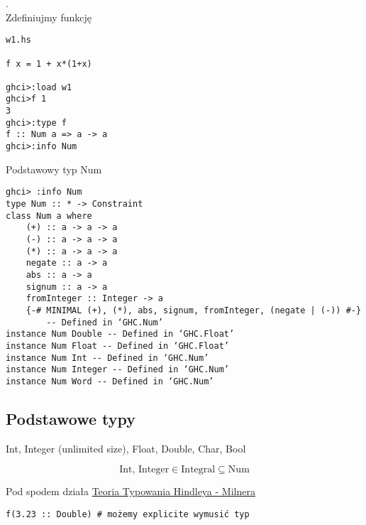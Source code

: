 \documentclass{article}
\newenvironment{definition}[1]{%
    \trivlist
    \item[\hskip\labelsep\textbf{Definition. #1.}]
    \ignorespaces
}{%
    \endtrivlist
}
\begin{document}
\begin{definition}{Funkcja jednej zmiennej}.\\

\noindent
Zdefiniujmy funkcję

\begin{verbatim}
w1.hs

f x = 1 + x*(1+x)

ghci>:load w1
ghci>f 1
3
ghci>:type f
f :: Num a => a -> a
ghci>:info Num 
\end{verbatim}
Podstawowy typ Num
\begin{verbatim}
ghci> :info Num
type Num :: * -> Constraint
class Num a where
    (+) :: a -> a -> a
    (-) :: a -> a -> a
    (*) :: a -> a -> a
    negate :: a -> a
    abs :: a -> a
    signum :: a -> a
    fromInteger :: Integer -> a
    {-# MINIMAL (+), (*), abs, signum, fromInteger, (negate | (-)) #-}
        -- Defined in ‘GHC.Num’
instance Num Double -- Defined in ‘GHC.Float’
instance Num Float -- Defined in ‘GHC.Float’
instance Num Int -- Defined in ‘GHC.Num’
instance Num Integer -- Defined in ‘GHC.Num’
instance Num Word -- Defined in ‘GHC.Num’
\end{verbatim}
\end{definition}

\subsection{Podstawowe typy}

Int, Integer (unlimited size), Float, Double, Char, Bool

\[
\text{Int, Integer} \in \text{Integral} \subseteq \text{Num}
\]

\begin{center}
\end{center}

\noindent
Pod spodem działa \href{https://en.wikipedia.org/wiki/Hindley%E2%80%93Milner_type_system}{Teoria Typowania Hindleya - Milnera}

\begin{verbatim}
f(3.23 :: Double) # możemy explicite wymusić typ
\end{verbatim}
\end{document}
